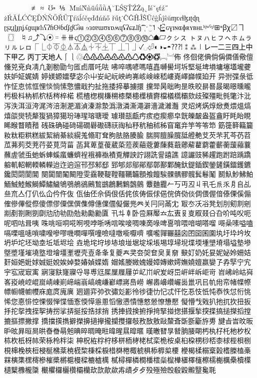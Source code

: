 ⊄⊅⊊⊋∉⌅⌆∥∦≢≅≈≶≷℧⹀⋚⋛⅕⌘
ḾḿǸǹǖǘǚǜĄ˘ĽŚŞŤŹŻą˛ľśˇşťź˝
żŔĂĹĆČĘĎŃŇŐŘŰŢŕăĺćčęďđńňő
řűţ˙ĈĜĤĴŜŬĉĝĥĵŝŭɱʋɾɬɮɹʈɖɳ
ɽʂʐɻɭɟɲʝʎɡɰʁħʕʔɦʘǂɓɗʄɠƓɨʉ
ɘɜɞɐɯʊɤɒʍɥʢʡɕʑɺɧ͡ˈ̍ˌˑ‿̏˥˦
˧˨˩̥̬̹̜̟̠̩̯̽˞̴̤̰̼̝̞̘̙̪̺̻̚
ɢɣɪɴɶɸʀʏʙʜʟʰʲʷˁˠˡ⊞ⁿꞵꭓ〼ヿ〖〗
♮♫⤴⤵⦿゠⧺⧻ς⓵⓶⓷⓸⓹⓺⓻⓼⓽⓾☖☗▱ㇰㇱㇲ
ㇳㇴㇵㇶㇷㇸㇹㇺㇻㇼㇽㇾㇿ⎾⎿⏀⏁⏂⏃⏄⏅⏆⏇⏈⏉
⏊⏋⏌✓␣⏎◐◑◒◓⁇⁈⁑⁂㆐㆑㆒㆓㆔㆕㆖㆗㆘㆙㆚
㆛㆜㆝㆞㆟⎰⎱♲♳♴♵♶♷♸♹♺♻♼♽゙゚⃝︗︘佈
佟佪佬倎倘偁僲僐儆儃儵兕兗㒵凊凢剗勌勖勻匜卣厝吒呿
咈啐喁喭嗎嘻嚞嚩嚳坷坼𡌛埏埤塤墉𡑮壒壠虁妋妒姃娓婧
婷媄嫄𡢽孽宓尒屮𡚴屺岏岟岣岪峐𡸴崍嵇嶁嶤嶧巋幞廹开
异弣弽彔彽怍怔怘怵恇悝惔惝愫憼憹戢扚扯拖捼揥摹擄擐
攩斝昺昢昫昰昳晈𣇄晷晸暍暻曛曨杇极枓枘枛柼栝梣椊楉
𣗄楂楤榥槏㮶㯃槩槵𣜿樻𣝣檔檥㰏欛欬歧殩殭毗毿氅汴沘
泻泆洱洹洿浘涔涪淛淝湄湞溱滁漐潙潡潾澌澠澼濇濊濰灎
灵炤烤焫焞焮煑煨熅熇熺燄爕㸿犛𤟱猧獐獦玢琫瑆瑢瑭璦
璩瓉瓿甗㽲痎瘂瘈癤皁皝皪皶盎盔盦盱眊眙睍睎睺瞀瞔矠
𥒎硃确碰𥔎碭礀礜礮礴祆祹秈𥝱秔秞秫秭窅𥧄竎竽笒笭笻
筯簁簳𥶡籭籹粏粔粠糕紱絜綃綦緂縨羗翛耵耷胊胠胳腠腧
腨腭膻臊臗䑛艠艴𦫿芡芣芤芩芿苕苽茀茢茭茺荇荽莧菏菑
菡萁萆葟葰葳蒅蒞蒺𦹀蔲蔞蔯蕤蕺薌薢藋藭藿蘄蘅蘐𧃴蘘
蘸虗虢䖝虵蚸蛼螇䗪蠊蠐裎𧚄褲褹襀覔觶詇詝詡詵諐譆譙
譩讝豉豨趯跑跗踣踽蹻𨉷䡄軺輞輭轔𨏍迨迮逈逭邗邳邾郄
郅郇郯鄔鄖鄢鄣鄯鄴醃釱鍉鍤鍥鎣鏟鐄鐳鑊鑣鑱閎閟閬閶
闋闐闓䦰闞隥雯靎鞕鞮鞺韁韉韛顖飧饘騃髁髃髎髖鬂鬈䰗
鬭魞魦鮄鮊鮞鯎鯥鯸鰣鱏鱐鱥鴝鴞鵃鵒鶊鶖鷀鶬鶼𪆐鷧鸇
麞麯龗𠂉丂丏丒丩丮乇𠂢乑㐆𠂤乩亝㐬亼仃仈仫仚仱仵伖
佤伷伾佘𠈓佷佸侂侅俦侲俅俋俒㑪俲倓倜偎偓偣傣傈傒傓
傕傪𠌫傱傺傻僄僇僳𠎁僎𠍱僔僡㒒𠏹儗𠑊兠𠔉关冃冋㒼冘
冣冭㓇𠗖凳划刖𠝏剕剜剬剷劄劂𠠇劘𠠺劤劺劻勊勑𠢹勷匵
卂𠥼𠦝卧卺厤厴𠫓厷叀𠬝㕝㕞叕㕣叴吤吨㕮呃呢呬咕咠咦
咮咷咺哃𠵅哬哯哱哳唀唁唉唼啁㖦啇㖨啤𠷡啽喂喑㗅嗒𠺕
𠹭喿嗉嗌嗑嗝㗚嗢𠹤嗩嘨𠽟嘇嘐嘰㗴嘽噀噇噞噠噭㘅嚈嚌
嚝嚨嚲囅囍囟囨囶囷𡈁𡉕圩𡉻坅坆坍𡉴坨坯坳坴坵坻𡋤𡋗
垚垝垞垨埗𡋽埌𡌶𡍄埞埰㙊埸埻埽堄堞堧堹𡏄塉塌塧墊墋
墍墏墐墔墝墪墱𡑭壃壍壢壳壴夅夆复夔𡗗㚑夽㚙奆㚖𦰩奟
𡙇奵奶奼妟妮妼姈姍姞姧姮𡜆𡝂㛏娍娗娧娭婥婺媋媜媟媠
媢媱媵媺媿嫚嫜嫥嫰嫮嫵嬈嬗嬴孌孒孨孯宁宄𡧃宖宬㝡㝢
寎寖㝬㝫寱寽㝵尃尩𡱖屟屧屨屰𡴭𡵅𡵸𡵢岈岊㟁𡶡𡶜岠岢
岧𡶒岭岵𡶷峉𡷠𡸳崆崐崫崝崠崱崹㟨嵡嵪㟴嵰𡼞㟽嶈㠀嶗
嶰嶴𡽶巑巗𡿺巤巩㠯㠶㡀帟帾幉㡜幖㡡幭幮𢅻庥庬庹廆廙
𢌞廽弈𢎭弞彇彣彲彾徏徢忇忋忒忓忔忢忮忯忳㤗怢怤㤚恌
悕您𢛳悱悾惈惙惮惵愐愙愞愺㥯慁慆慠𢡛憒憓憗憥憭𢢫懕
懝懵𢦏戣扒扡扤扻扭扳抙拕𢪸拽挃挐𢭏𢭐挲挵挻挼捁捄捎
𢭆捙𢰝𢮦捬掙𢰤掔掽揔揕揠揫揬揲搞搥搩搯摚摝摳摽撇撑
撟擋擌擕擗𢷡擤擿㩮攏攔㩳攞攲敄敔敫敺斄斊斲斵斸斿旉
旔㫖旹旼昄昈昡昪晅晑晎㫪𣇃𣇵𣆶晪晬晭晻暀暐暒㬎暭暱
暵㬚㬜㫗朁朒𣍲朙𣏓𣏒杍杔杝𣏐𣏤𣏕杴𣏚枒𣏟荣栐柃柈柒
柛柷𣑊𣑑𣑋栘栟栭𣑥栳栻栾桅桉桌桕桗㭷桫桮桼梂梐梖㭭
梘梙梚梜梪梫梴梻棻𣓤𣕚棃棅棌棙棤棥棬棷椃椇㮇𣖔㮍楆
楩楬楺榒㮤榖榰榺榼槀槑𣘹𣙇𣘸槣槮槯槳㯍槴槾樑樚樝𣜜
樲樳樿橉橺橎橒橤𣜌檋㯰檡𣝤檫檽櫆櫔櫐櫝𣟿𣟧櫱櫲櫳櫽
𣠤欋欏欐欑𣠽欗㰦欯歊歘歬歵⺞歺殁殛殮𣪘殽毇毈毉毚毦
